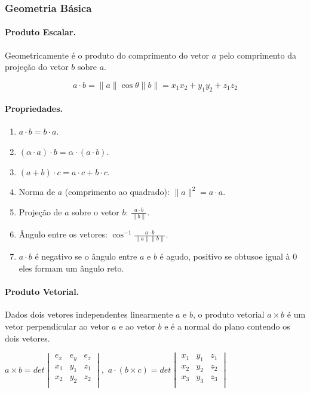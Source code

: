 \subsubsection{Geometria Básica}
\paragraph{Produto Escalar.}
Geometricamente é o produto do comprimento do vetor $a$ pelo comprimento da projeção do vetor $b$ sobre $a$.

$$a \cdot b = \|a\|\cos\theta \|b\| = x_1x_2+y_1y_2+z_1z_2$$

\paragraph{Propriedades.} \empty

	\begin{enumerate}
		\item $a \cdot b = b \cdot a$.
		\item $(\alpha \cdot a) \cdot b = \alpha\cdot(a \cdot b)$.
		\item $(a+b)\cdot c = a\cdot c + b \cdot c$.
		\item Norma de $a$ (comprimento ao quadrado): $\|a\|^2 = a \cdot a$.
		\item Projeção de $a$ sobre o vetor $b$: $\frac{a \cdot b}{\|b\|}$.
		\item Ângulo entre os vetores: $\cos^{-1}{\frac{a \cdot b}{\|a\|\|b\|}}$.
		\item $a \cdot b$ é negativo se o ângulo entre $a$ e $b$ é agudo, positivo se obtusoe igual à 0 eles formam um ângulo reto.	
	\end{enumerate}

\paragraph{Produto Vetorial.}
Dados dois vetores independentes linearmente $a$ e $b$, o produto vetorial $a \times b$ é um vetor perpendicular ao vetor $a$ e ao vetor $b$ e é a normal do plano contendo os dois vetores.

\begin{center}
	$
	a \times b = det
	\begin{vmatrix}
		e_x & e_y & e_z \\
		x_1 & y_1 & z_1 \\
		x_2 & y_2 & z_2 \\
	\end{vmatrix}, 
	$
	$
	a \cdot (b \times c) = det
	\begin{vmatrix}
		x_1 & y_1 & z_1 \\
		x_2 & y_2 & z_2 \\
		x_3 & y_3 & z_3 \\	
	\end{vmatrix}
	$
\end{center}

